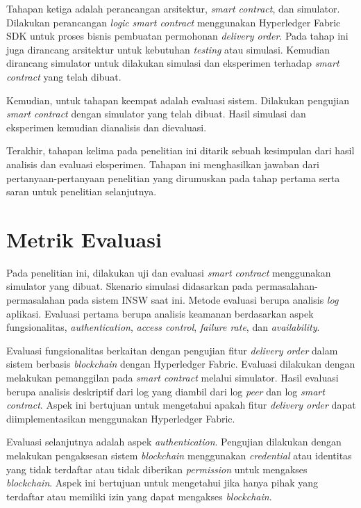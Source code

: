 Tahapan ketiga adalah perancangan arsitektur, \textit{smart contract}, dan simulator. Dilakukan perancangan \textit{logic} \textit{smart contract} menggunakan Hyperledger Fabric SDK untuk proses bisnis pembuatan permohonan \textit{delivery order}. Pada tahap ini juga dirancang arsitektur untuk kebutuhan \textit{testing} atau simulasi. Kemudian dirancang simulator untuk dilakukan simulasi dan eksperimen terhadap \textit{smart contract} yang telah dibuat.

Kemudian, untuk tahapan keempat adalah evaluasi sistem. Dilakukan pengujian \textit{smart contract} dengan simulator yang telah dibuat. Hasil simulasi dan eksperimen kemudian dianalisis dan dievaluasi.

Terakhir, tahapan kelima pada penelitian ini ditarik sebuah kesimpulan dari hasil analisis dan evaluasi eksperimen. Tahapan ini menghasilkan jawaban dari pertanyaan-pertanyaan penelitian yang dirumuskan pada tahap pertama serta saran untuk penelitian selanjutnya.


\section{Metrik Evaluasi}
\label{sec:metrikevaluasi}

Pada penelitian ini, dilakukan uji dan evaluasi \textit{smart contract} menggunakan simulator yang dibuat. Skenario simulasi didasarkan pada permasalahan-permasalahan pada sistem INSW saat ini. Metode evaluasi berupa analisis \textit{log} aplikasi. Evaluasi pertama berupa analisis keamanan berdasarkan aspek fungsionalitas, \textit{authentication}, \textit{access control}, \textit{failure rate}, dan \textit{availability}.

Evaluasi fungsionalitas berkaitan dengan pengujian fitur \textit{delivery order} dalam sistem berbasis \textit{blockchain} dengan Hyperledger Fabric. Evaluasi dilakukan dengan melakukan pemanggilan pada \textit{smart contract} melalui simulator. Hasil evaluasi berupa analisis deskriptif dari log yang diambil dari log \textit{peer} dan log \textit{smart contract}. Aspek ini bertujuan untuk mengetahui apakah fitur \textit{delivery order} dapat diimplementasikan menggunakan Hyperledger Fabric.

Evaluasi selanjutnya adalah aspek \textit{authentication}. Pengujian dilakukan dengan melakukan pengaksesan sistem \textit{blockchain} menggunakan \textit{credential} atau identitas yang tidak terdaftar atau tidak diberikan \textit{permission} untuk mengakses \textit{blockchain}. Aspek ini bertujuan untuk mengetahui jika hanya pihak yang terdaftar atau memiliki izin yang dapat mengakses \textit{blockchain}.

